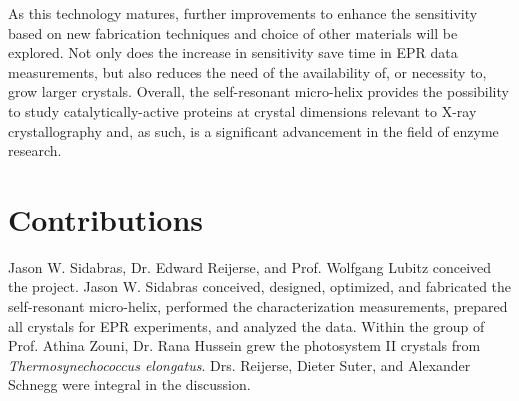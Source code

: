 As this technology matures, further improvements to enhance the sensitivity based on new fabrication techniques and choice of other materials will be explored. Not only does the increase in sensitivity save time in EPR data measurements, but also reduces the need of the availability of, or necessity to, grow larger crystals. Overall, the self-resonant micro-helix provides the possibility to study catalytically-active proteins at crystal dimensions relevant to X-ray crystallography and, as such, is a significant advancement in the field of enzyme research. 



\section*{Contributions} Jason W. Sidabras, Dr. Edward Reijerse, and Prof. Wolfgang Lubitz conceived the project. Jason W. Sidabras conceived, designed, optimized, and fabricated the self-resonant micro-helix, performed the characterization measurements, prepared all crystals for EPR experiments, and analyzed the data. Within the group of Prof. Athina Zouni, Dr. Rana Hussein grew the photosystem II crystals from {\em Thermosynechococcus elongatus}. Drs. Reijerse, Dieter Suter, and Alexander Schnegg were integral in the discussion. 

{\renewcommand{\bibsection}{\clearpage\section*{\bibname}\markboth{\bibname}{\bibname}}
\renewcommand{\bibname}{CHAPTER 5. REFERENCES}


}
